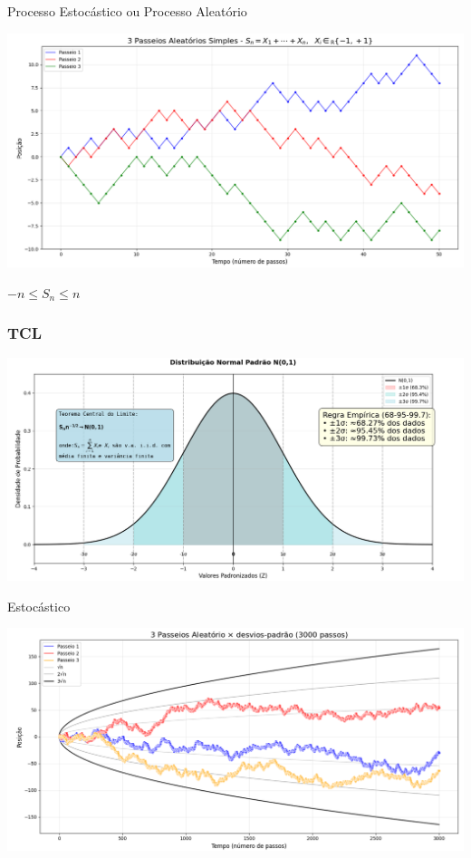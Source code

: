 \documentclass{beamer}
\begin{document}
\begin{frame}{Processo Estocástico ou Processo Aleatório}

\includegraphics[width=\textwidth]{srw1.png}

\vfill

\pause

\hfill $-n \leq S_n \leq n$
\hfill
\hfill

\end{frame}

\begin{frame}
  \frametitle{TCL}
  \includegraphics[width=\textwidth]{tcl.png}

\end{frame}
\begin{frame}{Estocástico}

\includegraphics[width=\textwidth]{srw2.png}

\end{frame}
\end{document}
